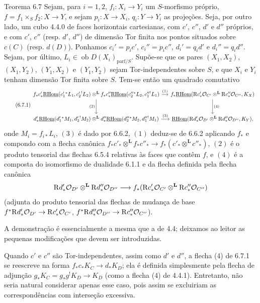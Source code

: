 \begin{statement}{Teorema 6.7}
Sejam, para $i=1,2$, $f_i:X_i\to Y_i$ um $S$-morfismo próprio, $f=f_1\times_Sf_2:X\to Y$, e sejam $p_i:X\to X_i$, $q_i:Y\to Y_i$ as projeções. Seja, por outro lado, um cubo 4.4.0 de faces horizontais cartesianas, com $c'$, $c''$, $d'$ e $d''$ próprios, e com $c'$, $c''$ (resp. $d'$, $d''$) de dimensão Tor finita nos pontos situados sobre $c(C)$ (resp. $d(D)$). Ponhamos $c_i'=p_ic'$, $c_i''=p_ic''$, $d_i'=q_id'$ e $d_i''=q_id''$. Sejam, por último, $L_i\in\operatorname{ob}D(X_i)_{\mathrm{parf}/S}$. Supõe-se que os pares $(X_1,X_2)$, $(X_1,Y_2)$, $(Y_1,X_2)$ e $(Y_1,Y_2)$ sejam Tor-independentes sobre $S$, e que $X_i$ e $Y_i$ tenham dimensão Tor finita sobre $S$. Tem-se então um quadrado comutativo
\begin{equation}
\tag{6.7.1}
\begin{tikzcd}[column sep=small,row sep=large]
f_*c'_*\uRHom(c_1'{}^*L_1,c_2'{}^!L_2)\otimes^{\mathbf L} f_*c''_*\uRHom(c_2''{}^*L_2,c_1''{}^!L_1) \arrow[r,"(1)"] \arrow[d,"(2)"']
& f_*\uRHom(\R c'_*\cO_{C'}\otimes^{\mathbf L}\R c''_*\cO_{C''},K_X) \arrow[d,"(4)"] \\
d'_*\uRHom(d_1'{}^*M_1,d_2'{}^!M_2)\otimes^{\mathbf L} d''_*\uRHom(d_2''{}^*M_2,d_1''{}^!M_1) \arrow[r,"(3)"]
& \uRHom(\R d'_*\cO_{D'}\otimes^{\mathbf L}\R d''_*\cO_{D''},K_Y),
\end{tikzcd}
\end{equation}
onde $M_i=f_{i*}L_i$, $(3)$ é dado por 6.6.2, $(1)$ deduz-se de 6.6.2 aplicando $f_*$ e compondo com a flecha canônica $f_*c'_*\otimes^{\mathbf L} f_*c''_*\to f_*(c'_*\otimes^{\mathbf L} c''_*)$, $(2)$ é o produto tensorial das flechas 6.5.4 relativas às faces que contêm $f$, e $(4)$ é a composta do isomorfismo de dualidade 6.1.1 e da flecha definida pela flecha canônica
\[
\mathrm{R} d'_*\mathcal{O}_{D'}\otimes^{\mathbf L}\mathrm{R} d''_*\mathcal{O}_{D''}\longrightarrow f_*(\mathrm{R} c'_*\mathcal{O}_{C'}\otimes^{\mathbf L}\mathrm{R} c''_*\mathcal{O}_{C''})
\]
(adjunta do produto tensorial das flechas de mudança de base $f^*\mathrm{R} d'_*\mathcal{O}_{D'}\to \mathrm{R} c'_*\mathcal{O}_{C'}$, $f^*\mathrm{R} d''_*\mathcal{O}_{D''}\to \mathrm{R} c''_*\mathcal{O}_{C''}$).
\end{statement}

A demonstração é essencialmente a mesma que a de 4.4; deixamos ao leitor as pequenas modificações que devem ser introduzidas.

Quando $c'$ e $c''$ são Tor-independentes, assim como $d'$ e $d''$, a flecha (4) de 6.7.1 se reescreve na forma $f_*c_*K_C\to d_*K_D$; ela é definida simplesmente pela flecha de adjunção $g_*K_C=g_*g^!K_D\to K_D$ (como a flecha (4) de 4.4.1). Entretanto, não seria natural considerar apenas esse caso, pois assim se excluiriam as correspondências com interseção excessiva.

